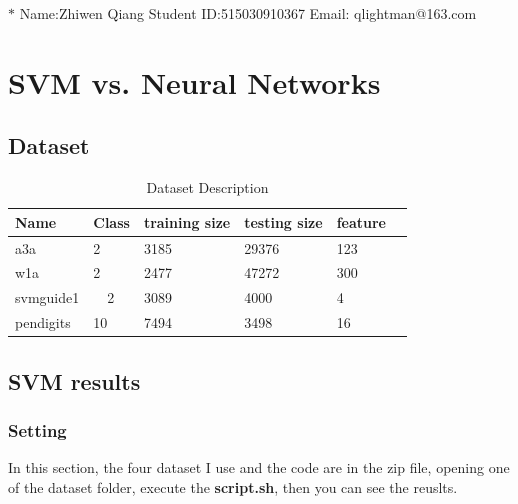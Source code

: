 \documentclass{article}
\theoremstyle{definition}
\numberwithin{equation}{section}
\numberwithin{figure}{section}
\begin{document}
\noindent

\noindent{}
\begin{center}

\footnotesize{\color{steelblue}$*$ Name:Zhiwen Qiang  \quad Student ID:515030910367 \quad Email: qlightman@163.com}
\end{center}

\section{SVM vs. Neural Networks}
\subsection{Dataset}
\begin{table}[htbp]

\centering

\caption{Dataset Description}

\label{my-label}

\begin{tabular}{llllll}

\hline

 Name& Class & training size&	testing size &	feature \\ 
 \hline
 a3a & 2&	3185&	29376 &	123\\
 w1a& 2	& 2477	&47272&	300\\
 svmguide1&　2 & 3089 & 4000 & 4\\
 pendigits & 10& 7494&	3498&	16
\end{tabular}

\end{table}
\subsection{SVM results}
\subsubsection{Setting}
In this section, the four dataset I use and the code are in the zip file, opening one of the dataset folder, execute the \textbf{script.sh}, then you can see the reuslts.
\end{document}

